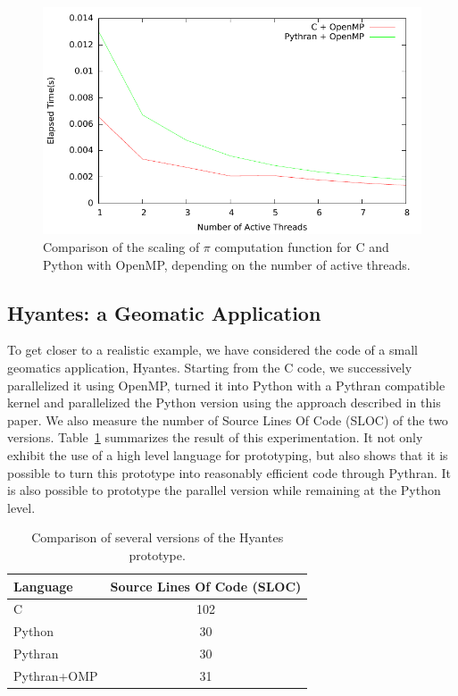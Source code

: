 \documentclass[conference]{IEEEtran}
\begin{document}
\begin{figure}

    \caption{Comparison of the scaling of $\pi$ computation function for C and
    Python with OpenMP, depending on the number of active threads.}
    \label{fig:motivating-example-scale}

    \includegraphics[width=.5\textwidth]{pi_omp_bench.pdf}

\end{figure}


\subsection{Hyantes: a Geomatic Application}

To get closer to a realistic example, we have considered the code of a small
geomatics application, Hyantes. Starting from the C code, we successively
parallelized it using OpenMP, turned it into Python with a Pythran compatible
kernel and parallelized the Python version using the approach described in this
paper. We also measure the number of Source Lines Of Code (SLOC) of the two
versions.  Table~\ref{tbl:hyantes} summarizes the result of this
experimentation. It not only exhibit the use of a high level language
for prototyping, but also shows that it is possible to
turn this prototype into reasonably efficient code through Pythran. It is also
possible to prototype the parallel version while remaining at the Python level.

\begin{table}

    \caption{Comparison of several versions of the Hyantes prototype.}
    \label{tbl:hyantes}

    \centering
    \begin{tabular}{|l|c|}
        \hline
        Language & Source Lines Of Code (SLOC) \\
        \hline
        C       & 102       \\
        Python  & 30        \\
        Pythran & 30        \\
        Pythran+OMP    & 31 \\
        \hline
    \end{tabular}

\end{table}
\end{document}

